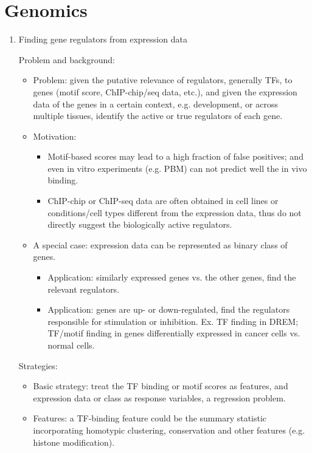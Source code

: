 \documentclass[11pt]{article}
\begin{document}
\section{Genomics}
\begin{enumerate}


\item{Finding gene regulators from expression data}

Problem and background:
\begin{itemize}
\item Problem: given the putative relevance of regulators, generally TFs, to genes (motif score, ChIP-chip/seq data, etc.), and given the expression data of the genes in a certain context, e.g. development, or across multiple tissues, identify the active or true regulators of each gene. 

\item Motivation: 
\begin{itemize}
	\item Motif-based scores may lead to a high fraction of false positives; and even in vitro experiments (e.g. PBM) can not predict well the in vivo binding. 
	\item ChIP-chip or ChIP-seq data are often obtained in cell lines or conditions/cell types different from the expression data, thus do not directly suggest the biologically active regulators. 
\end{itemize}

\item A special case: expression data can be represented as binary class of genes. 
\begin{itemize}
	\item Application: similarly expressed genes vs. the other genes, find the relevant regulators. 
	\item Application: genes are up- or down-regulated, find the regulators responsible for stimulation or inhibition. Ex. TF finding in DREM; TF/motif finding in genes differentially expressed in cancer cells vs. normal cells. 
\end{itemize}
\end{itemize}
 
Strategies: 
\begin{itemize}
\item Basic strategy: treat the TF binding or motif scores as features, and expression data or class as response variables, a regression problem. 

\item Features: a TF-binding feature could be the summary statistic incorporating homotypic clustering, conservation and other features (e.g. histone modification). 


\end{itemize}
\end{enumerate}
\end{document}
